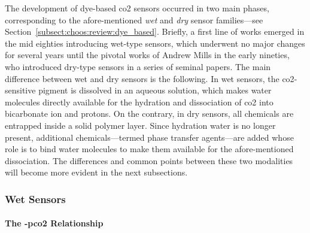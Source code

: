 The development of dye-based \gls{co2} sensors occurred in two main phases, corresponding to the afore-mentioned \emph{wet} and \emph{dry} sensor families---see Section~\ref{subsect:choos:review:dye_based}. Briefly, a first line of works emerged in the mid eighties introducing wet-type sensors\cite{vurek1983, zhujun1984a, zhujun1984b, opitz1984}, which underwent no major changes for several years until the pivotal works of Andrew Mills in the early nineties, who introduced dry-type sensors in a series of seminal papers\cite{mills1992, mills1993, mills1997}. The main difference between wet and dry sensors is the following. In wet sensors, the \gls{co2}-sensitive pigment is dissolved in an aqueous solution, which makes water molecules directly available for the hydration and dissociation of \gls{co2} into bicarbonate ion and protons. On the contrary, in dry sensors, all chemicals are entrapped inside a solid polymer layer. Since hydration water is no longer present, additional chemicals---termed phase transfer agents---are added whose role is to bind water molecules to make them available for the afore-mentioned dissociation. The differences and common points between these two modalities will become more evident in the next subsections.

\subsubsection{Wet Sensors}

\paragraph{The \texorpdfstring{\pH-\gls{pco2}}{pH-pCO2} Relationship}\mbox{}\\

